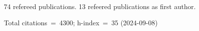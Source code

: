 74 refereed publications. 13 refeered publications as first author.

Total citations~=~4300; h-index~=~35 (2024-09-08)